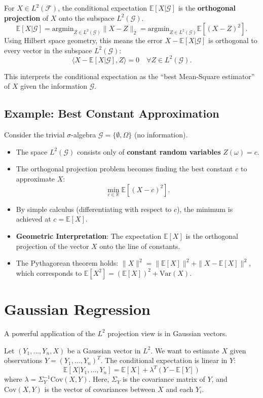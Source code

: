\begin{theorem}
For $X \in L^2(\mathcal{F})$, the conditional expectation $\mathbb{E}[X|\mathcal{G}]$ is the \textbf{orthogonal projection} of $X$ onto the subspace $L^2(\mathcal{G})$.
\[
\mathbb{E}[X|\mathcal{G}] = \text{argmin}_{Z \in L^2(\mathcal{G})} \| X - Z \|_2 = \text{argmin}_{Z \in L^2(\mathcal{G})} \mathbb{E}[(X-Z)^2].
\]
Using Hilbert space geometry, this means the error $X - \mathbb{E}[X|\mathcal{G}]$ is orthogonal to every vector in the subspace $L^2(\mathcal{G})$:
\[
\langle X - \mathbb{E}[X|\mathcal{G}], Z \rangle = 0 \quad \forall Z \in L^2(\mathcal{G}).
\]
\end{theorem}
This interprets the conditional expectation as the ``best Mean-Square estimator'' of $X$ given the information $\mathcal{G}$.

\subsection{Example: Best Constant Approximation}
Consider the trivial $\sigma$-algebra $\mathcal{G} = \{ \emptyset, \Omega \}$ (no information).
\begin{itemize}
    \item The space $L^2(\mathcal{G})$ consists only of \textbf{constant random variables} $Z(\omega) = c$.
    \item The orthogonal projection problem becomes finding the best constant $c$ to approximate $X$:
    \[
    \min_{c \in \mathbb{R}} \mathbb{E}[(X - c)^2].
    \]
    \item By simple calculus (differentiating with respect to $c$), the minimum is achieved at $c = \mathbb{E}[X]$.
    \item \textbf{Geometric Interpretation}: The expectation $\mathbb{E}[X]$ is the orthogonal projection of the vector $X$ onto the line of constants.
    \item The Pythagorean theorem holds: $\|X\|^2 = \|\mathbb{E}[X]\|^2 + \|X - \mathbb{E}[X]\|^2$, which corresponds to $\mathbb{E}[X^2] = (\mathbb{E}[X])^2 + \text{Var}(X)$.
\end{itemize}

\section{Gaussian Regression}
A powerful application of the $L^2$ projection view is in Gaussian vectors.

\begin{theorem}
Let $(Y_1, \dots, Y_n, X)$ be a Gaussian vector in $L^2$. We want to estimate $X$ given observations $Y = (Y_1, \dots, Y_n)^T$.
The conditional expectation is linear in $Y$:
\[
\mathbb{E}[X | Y_1, \dots, Y_n] = \mathbb{E}[X] + \lambda^T (Y - \mathbb{E}[Y])
\]
where $\lambda = \Sigma_Y^{-1} \text{Cov}(X, Y)$. Here, $\Sigma_Y$ is the covariance matrix of $Y$, and $\text{Cov}(X, Y)$ is the vector of covariances between $X$ and each $Y_i$.
\end{theorem}

